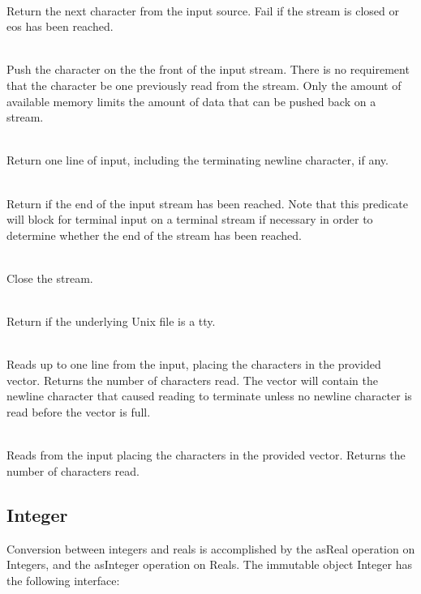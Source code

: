 \begin{desc}
  \item[\kw{operation} getChar \returns{} \/\LB{}\tn{Character}\/\RB{}]~\\
    Return the next character from the input source.  Fail if the stream is
    closed or eos has been reached.
  \item[\kw{operation} unGetChar\/\LB{}c \CO{} \tn{Character}\/\RB{}]~\\
    Push the character on the the front of the input stream.  There is no
    requirement that the character be one previously read from the stream.
    Only the amount of available memory limits the amount of data that can
    be pushed back on a stream.
  \item[\kw{operation} getString \returns{} \/\LB{}\tn{String}\/\RB{}]~\\
    Return one line of input, including the terminating newline
    character, if any.
  \item[\kw{function} eos \returns{} \/\LB{}\tn{Boolean}\/\RB{}]~\\
    Return  if the end of the input stream has been reached.  Note
    that this predicate will block for terminal input on a terminal stream
    if necessary in order to determine whether the end of the stream has
    been reached.
  \item[\kw{operation} close]~\\
    Close the stream.
  \item[\kw{function} isAtty \returns{} \/\LB{}\tn{Boolean}\/\RB{}]~\\
    Return  if the underlying Unix file is a tty.
  \item[\kw{operation} fillVector\/\LB{}VectorOfChar\/\RB{} \returns{} \/\LB{}Integer\/\RB{}]~\\
    Reads up to one line from the input, placing the characters in the
    provided vector.  Returns the number of characters read.  The vector
    will contain the newline character that caused reading to terminate
    unless no newline 
    character is read before the vector is full.
  \item[\kw{operation} rawRead\/\LB{}VectorOfChar\/\RB{} \returns{} \/\LB{}Integer\/\RB{}]~\\
    Reads from the input placing the characters in the
    provided vector.  Returns the number of characters read.  
\end{desc}

\subsection{Integer}
\label{builtin Integer}
Conversion between integers and reals is accomplished by the asReal
operation on Integers, and the asInteger operation on Reals.  
The immutable object Integer has the following interface:

